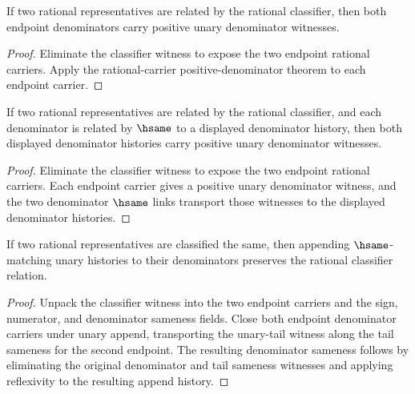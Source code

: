 \begin{theorem}
\label{thm:rat-classifier-positive-denominators}
If two rational representatives are related by the rational classifier, then
both endpoint denominators carry positive unary denominator witnesses.
\end{theorem}
\begin{proof}
Eliminate the classifier witness to expose the two endpoint rational carriers.
Apply the rational-carrier positive-denominator theorem to each endpoint
carrier.
\end{proof}

\begin{theorem}
\label{thm:rat-classifier-denominator-positive-transport}
If two rational representatives are related by the rational classifier, and
each denominator is related by $\hsame$ to a displayed denominator history,
then both displayed denominator histories carry positive unary denominator
witnesses.
\end{theorem}
\begin{proof}
Eliminate the classifier witness to expose the two endpoint rational carriers.
Each endpoint carrier gives a positive unary denominator witness, and the two
denominator $\hsame$ links transport those witnesses to the displayed
denominator histories.
\end{proof}

\begin{theorem}
\label{thm:rat-classifier-append-unary-denominators-closed}
If two rational representatives are classified the same, then appending
$\hsame$-matching unary histories to their denominators preserves the
rational classifier relation.
\end{theorem}
\begin{proof}
Unpack the classifier witness into the two endpoint carriers and the sign,
numerator, and denominator sameness fields. Close both endpoint denominator
carriers under unary append, transporting the unary-tail witness along the
tail sameness for the second endpoint. The resulting denominator sameness follows by
eliminating the original denominator and tail sameness witnesses and applying
reflexivity to the resulting append history.
\end{proof}

